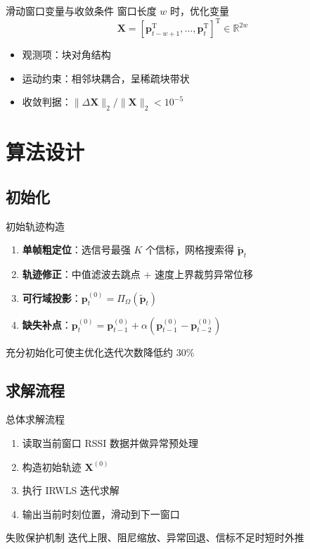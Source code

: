 \documentclass[aspectratio=169]{beamer}
\newcommand{\T}{\mathrm{T}}
\newcommand{\R}{\mathbb{R}}
\begin{document}
\begin{frame}{滑动窗口变量与收敛条件}
  窗口长度 $w$ 时，优化变量
  \[
    \bm X=[\bm p_{t-w+1}^{\T},\dots,\bm p_t^{\T}]^{\T}\in\R^{2w}
  \]
  \begin{itemize}
    \item 观测项：块对角结构
    \item 运动约束：相邻块耦合，呈稀疏块带状
    \item 收敛判据：$\|\Delta \bm X\|_2/\|\bm X\|_2<10^{-5}$
  \end{itemize}
\end{frame}

\section{算法设计}

\subsection{初始化}

\begin{frame}{初始轨迹构造}
  \begin{enumerate}
    \setlength{\itemsep}{6pt}
    \item \textbf{单帧粗定位}：选信号最强 $K$ 个信标，网格搜索得 $\tilde{\bm p}_t$
    \item \textbf{轨迹修正}：中值滤波去跳点 + 速度上界裁剪异常位移
    \item \textbf{可行域投影}：$\bm p_t^{(0)}=\Pi_{\Omega}(\tilde{\bm p}_t)$
    \item \textbf{缺失补点}：$\bm p_t^{(0)}=\bm p_{t-1}^{(0)}+\alpha(\bm p_{t-1}^{(0)}-\bm p_{t-2}^{(0)})$
  \end{enumerate}
  \vspace{3mm}
  充分初始化可使主优化迭代次数降低约 30\%
\end{frame}

\subsection{求解流程}

\begin{frame}{总体求解流程}
  \begin{enumerate}
    \setlength{\itemsep}{8pt}
    \item 读取当前窗口 RSSI 数据并做异常预处理
    \item 构造初始轨迹 $\bm X^{(0)}$
    \item 执行 IRWLS 迭代求解
    \item 输出当前时刻位置，滑动到下一窗口
  \end{enumerate}
  \vspace{4mm}
  \begin{block}{失败保护机制}
    迭代上限、阻尼缩放、异常回退、信标不足时短时外推
  \end{block}
\end{frame}
\end{document}

